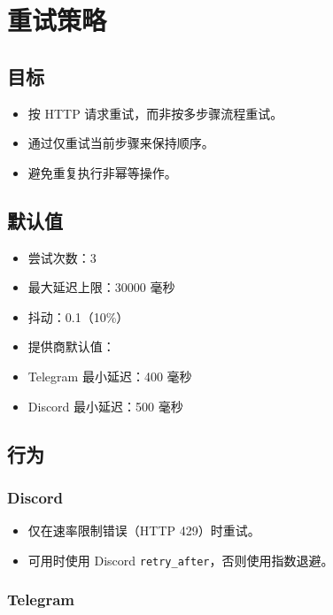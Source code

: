 \clearpage

\section{重试策略}


\subsection{目标}


\begin{itemize}
  \item 按 HTTP 请求重试，而非按多步骤流程重试。
  \item 通过仅重试当前步骤来保持顺序。
  \item 避免重复执行非幂等操作。
\end{itemize}


\subsection{默认值}


\begin{itemize}
  \item 尝试次数：3
  \item 最大延迟上限：30000 毫秒
  \item 抖动：0.1（10\%）
  \item 提供商默认值：
  \item Telegram 最小延迟：400 毫秒
  \item Discord 最小延迟：500 毫秒
\end{itemize}


\subsection{行为}


\subsubsection{Discord}


\begin{itemize}
  \item 仅在速率限制错误（HTTP 429）时重试。
  \item 可用时使用 Discord \texttt{retry\_after}，否则使用指数退避。
\end{itemize}


\subsubsection{Telegram}


